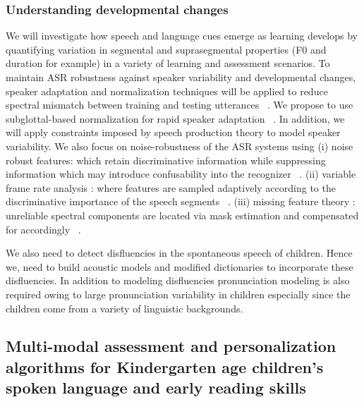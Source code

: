 \subsubsection{Understanding developmental changes} We will investigate how speech and language cues emerge as learning develops by quantifying variation in segmental and suprasegmental properties (F0 and duration for example) in a variety of learning and assessment scenarios. To maintain ASR robustness against speaker variability and developmental changes, speaker adaptation and normalization techniques will be applied to reduce spectral mismatch between training and testing utterances ~\cite{leggetter1995maximum}. We propose to use subglottal-based normalization for rapid speaker adaptation ~\cite{arsikere2012automatic}. In addition, we will apply constraints imposed by speech production theory to model speaker variability. We also focus on noise-robustness of the ASR systems using (i) noise robust features: which retain discriminative information while suppressing information which may introduce confusability into the recognizer ~\cite{strope1998robust}. (ii) variable frame rate analysis : where features are sampled adaptively according to the discriminative importance of the speech segments ~\cite{zhu2003non, you2004entropy}. (iii) missing feature theory : unreliable spectral components are located via mask estimation and compensated for accordingly ~\cite{borgstrom2009missing, tan2014feature}.
 
We also need to detect disfluencies in the spontaneous speech of children. Hence we, need to build acoustic models and modified dictionaries to incorporate these disfluencies. In addition to modeling disfluencies pronunciation modeling is also required owing to large pronunciation variability in children \cite{tepperman2006pronunciation} especially since the children come from a variety of linguistic backgrounds.	



\subsection {Multi-modal assessment and personalization algorithms for Kindergarten age children's spoken language and early reading skills}
\label{section_assessment}

